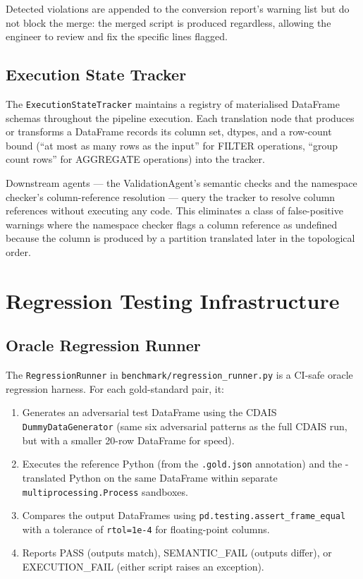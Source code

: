 Detected violations are appended to the conversion report's warning list but
do not block the merge: the merged script is produced regardless, allowing the
engineer to review and fix the specific lines flagged.

\subsection{Execution State Tracker}
\label{subsec:execution-state-impl}

The \texttt{ExecutionStateTracker} maintains a registry of materialised
DataFrame schemas throughout the pipeline execution. Each translation node that
produces or transforms a DataFrame records its column set, dtypes, and a
row-count bound (``at most as many rows as the input'' for FILTER operations,
``group count rows'' for AGGREGATE operations) into the tracker.

Downstream agents --- the ValidationAgent's semantic checks and the namespace
checker's column-reference resolution --- query the tracker to resolve column
references without executing any code. This eliminates a class of false-positive
warnings where the namespace checker flags a column reference as undefined
because the column is produced by a partition translated later in the
topological order.

\section{Regression Testing Infrastructure}
\label{sec:regression-impl}

\subsection{Oracle Regression Runner}
\label{subsec:regression-runner-impl}

The \texttt{RegressionRunner} in
\texttt{benchmark/regression\_runner.py} is a CI-safe oracle regression
harness. For each gold-standard pair, it:

\begin{enumerate}
  \item Generates an adversarial test DataFrame using the CDAIS
    \texttt{DummyDataGenerator} (same six adversarial patterns as the
    full CDAIS run, but with a smaller 20-row DataFrame for speed).
  \item Executes the reference Python (from the \texttt{.gold.json}
    annotation) and the \codara{}-translated Python on the same DataFrame
    within separate \texttt{multiprocessing.Process} sandboxes.
  \item Compares the output DataFrames using \texttt{pd.testing.assert\_frame\_equal}
    with a tolerance of \texttt{rtol=1e-4} for floating-point columns.
  \item Reports PASS (outputs match), SEMANTIC\_FAIL (outputs differ), or
    EXECUTION\_FAIL (either script raises an exception).
\end{enumerate}


